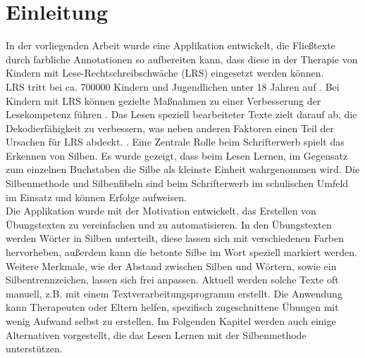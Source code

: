 
\chapter{Einleitung}

In der vorliegenden Arbeit wurde eine Applikation entwickelt, die Fließtexte durch farbliche Annotationen so aufbereiten kann, dass diese in der Therapie von Kindern mit Lese-Rechtschreibschwäche (LRS) eingesetzt werden können.\\

LRS tritt bei ca. 700000 Kindern und Jugendlichen unter 18 Jahren auf \cite{Schulte-Koerne2014} . Bei Kindern mit LRS können gezielte Maßnahmen zu einer Verbesserung der Lesekompetenz führen . Das Lesen speziell bearbeiteter Texte zielt darauf ab, die Dekodierfähigkeit zu verbessern, was neben anderen Faktoren einen Teil der Ursachen für LRS abdeckt. . Eine Zentrale Rolle beim Schrifterwerb spielt das Erkennen von Silben. Es wurde gezeigt, dass beim Lesen Lernen, im Gegensatz zum einzelnen Buchstaben die Silbe als kleinste Einheit wahrgenommen wird.  Die Silbenmethode und Silbenfibeln sind beim Schrifterwerb im schulischen Umfeld im Einsatz  und können Erfolge aufweisen.\\

Die Applikation wurde mit der Motivation entwickelt, das Erstellen von Übungstexten zu vereinfachen und zu automatisieren. In den Übungstexten werden Wörter in Silben unterteilt, diese lassen sich mit verschiedenen Farben hervorheben, außerdem kann die betonte Silbe im Wort speziell markiert werden. Weitere Merkmale, wie der Abstand zwischen Silben und Wörtern, sowie ein Silbentrennzeichen, lassen sich frei anpassen. Aktuell werden solche Texte oft manuell, z.B. mit einem Textverarbeitungsprogramm erstellt. Die Anwendung kann Therapeuten oder Eltern helfen, spezifisch zugeschnittene Übungen mit wenig Aufwand selbst zu erstellen. Im Folgenden Kapitel werden auch einige Alternativen vorgestellt, die das Lesen Lernen mit der Silbenmethode unterstützen.\\








